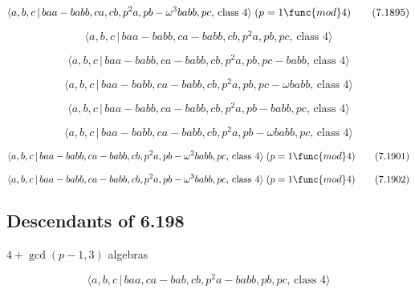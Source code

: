 \documentclass[10pt]{article}
\begin{document}
\begin{equation}
\langle a,b,c\,|\,baa-babb,ca,cb,p^{2}a,pb-\omega ^{3}babb,pc,\,\text{class }%
4\rangle \;(p=1\func{mod}4)  \tag{7.1895}
\end{equation}

\begin{equation}
\langle a,b,c\,|\,baa-babb,ca-babb,cb,p^2a,pb,pc,\,\text{class }4\rangle 
\tag{7.1896}
\end{equation}

\begin{equation}
\langle a,b,c\,|\,baa-babb,ca-babb,cb,p^2a,pb,pc-babb,\,\text{class }4\rangle
\tag{7.1897}
\end{equation}

\begin{equation}
\langle a,b,c\,|\,baa-babb,ca-babb,cb,p^{2}a,pb,pc-\omega babb,\,\text{class 
}4\rangle  \tag{7.1898}
\end{equation}

\begin{equation}
\langle a,b,c\,|\,baa-babb,ca-babb,cb,p^2a,pb-babb,pc,\,\text{class }4\rangle
\tag{7.1899}
\end{equation}

\begin{equation}
\langle a,b,c\,|\,baa-babb,ca-babb,cb,p^{2}a,pb-\omega babb,pc,\,\text{class 
}4\rangle  \tag{7.1900}
\end{equation}

\begin{equation}
\langle a,b,c\,|\,baa-babb,ca-babb,cb,p^{2}a,pb-\omega ^{2}babb,pc,\,\text{%
class }4\rangle \;(p=1\func{mod}4)  \tag{7.1901}
\end{equation}

\begin{equation}
\langle a,b,c\,|\,baa-babb,ca-babb,cb,p^{2}a,pb-\omega ^{3}babb,pc,\,\text{%
class }4\rangle \;(p=1\func{mod}4)  \tag{7.1902}
\end{equation}

\subsection{Descendants of 6.198}

$4+\gcd (p-1,3)$ algebras

\begin{equation}
\langle a,b,c\,|\,baa,ca-bab,cb,p^2a-babb,pb,pc,\,\text{class }4\rangle 
\tag{7.1903}
\end{equation}
\end{document}
